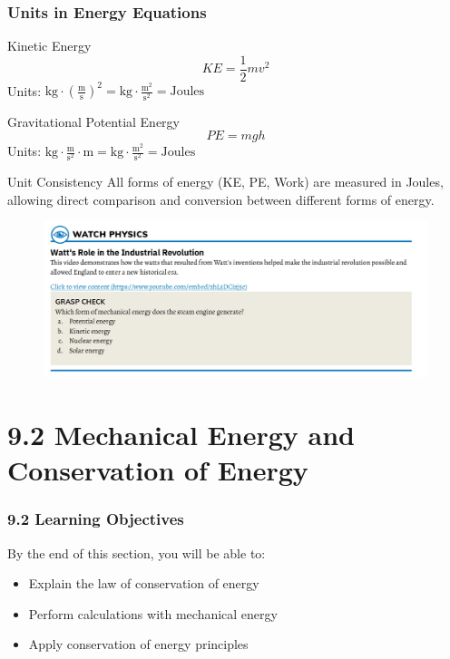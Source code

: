 \documentclass{beamer}
\begin{document}
\begin{frame}
\frametitle{Units in Energy Equations}
\begin{block}{Kinetic Energy}
$$KE = \frac{1}{2}mv^2$$
Units: $\text{kg} \cdot (\frac{\text{m}}{\text{s}})^2 = \text{kg}\cdot\frac{\text{m}^2}{\text{s}^2} = \text{Joules}$
\end{block}

\begin{block}{Gravitational Potential Energy}
$$PE = mgh$$
Units: $\text{kg} \cdot \frac{\text{m}}{\text{s}^2} \cdot \text{m} = \text{kg}\cdot\frac{\text{m}^2}{\text{s}^2} = \text{Joules}$
\end{block}

\begin{exampleblock}{Unit Consistency}
All forms of energy (KE, PE, Work) are measured in Joules, allowing direct comparison and conversion between different forms of energy.
\end{exampleblock}
\end{frame}

\begin{frame}
\begin{figure}
    \centering
    \includegraphics[width=1\linewidth]{steam.png}
\end{figure}
\end{frame}

\section{9.2 Mechanical Energy and Conservation of Energy}

\begin{frame}
\frametitle{9.2 Learning Objectives}
By the end of this section, you will be able to:
\begin{itemize}
\item Explain the law of conservation of energy
\item Perform calculations with mechanical energy
\item Apply conservation of energy principles
\end{itemize}
\end{frame}
\end{document}
